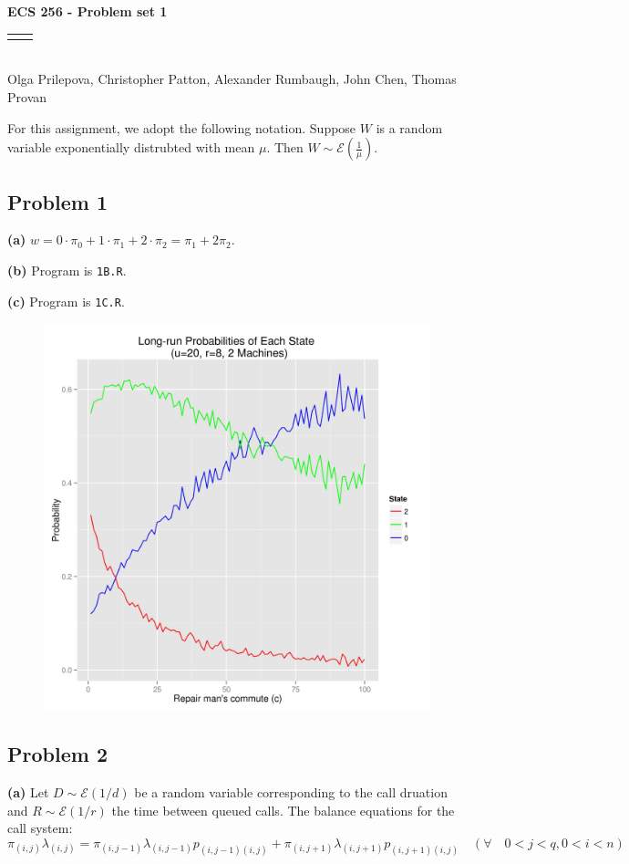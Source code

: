 \documentclass[12pt]{article}
\renewcommand{\title}[1]{\textbf{#1}\\}
\renewcommand{\line}{\begin{tabularx}{\textwidth}{X>{\raggedleft}X}\hline\\\end{tabularx}\\[-0.5cm]}
\begin{document}
\title{ECS 256 - Problem set 1}
\line
Olga Prilepova, Christopher Patton, Alexander Rumbaugh, John Chen, Thomas Provan


For this assignment, we adopt the following notation. Suppose $W$ is a random
variable exponentially distrubted with mean $\mu$. Then 
$W \sim \mathcal{E}(\frac{1}{\mu})$.

\subsection*{Problem 1}

\textbf{(a)} $w = 0 \cdot \pi_0 + 1 \cdot \pi_1 + 2 \cdot \pi_2 = \pi_1 + 2 \pi_2$. 

\textbf{(b)} Program is \texttt{1B.R}.

\textbf{(c)} Program is \texttt{1C.R}.
\begin{figure}[h]
  \includegraphics[scale=0.7]{1C.jpg}
\end{figure}
\pagebreak


\subsection*{Problem 2}

\textbf{(a)} Let $D \sim \mathcal{E}(1/d)$ be a random variable corresponding 
to the call druation and $R \sim \mathcal{E}(1/r)$ the time between queued calls. 
The balance equations for the call system: 
$$ \pi_{(i,j)}\lambda_{(i,j)} = \pi_{(i,j-1)}\lambda_{(i,j-1)}p_{(i,j-1)(i,j)} + 
                                \pi_{(i,j+1)}\lambda_{(i,j+1)}p_{(i,j+1)(i,j)} 
  \quad (\forall \quad 0 < j < q, 0 < i < n)$$
\end{document}
